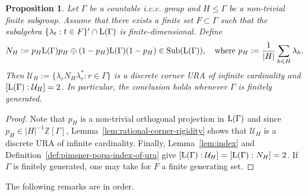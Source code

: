 \documentclass[12pt]{amsart} %
\theoremstyle{plain}
\newtheorem{proposition}[theorem]{Proposition}
\theoremstyle{definition}
\newcommand{\Z}{\mathbb{Z}}
\newcommand{\LL}{{\rm L}}
\DeclareMathOperator{\Sub}{Sub}
\begin{document}
\begin{proposition}\label{prop:finite-subgroup-corner-ura}
Let $\Gamma$ be a countable i.c.c. group and $H\leq\Gamma$ be a non-trivial
finite subgroup. Assume that there exists a finite set
$F\subset\Gamma$ such that the subalgebra $\{\lambda_t:t\in F\}'\cap\LL(\Gamma)$ is finite-dimensional.
Define
$$
N_H:=p_H\LL(\Gamma)p_H\oplus(1-p_H)\LL(\Gamma)(1-p_H)\in\Sub(\LL(\Gamma)),\quad\text{where }p_H:=\frac{1}{\vert H\vert}\sum_{h\in H}\lambda_h.
$$
Then $\mathcal U_H:=\{\lambda_rN_H\lambda_r^*:r\in\Gamma\}$
is a discrete corner URA of infinite cardinality and
$[\LL(\Gamma):\mathcal U_H]=2$.
In particular, the conclusion holds whenever $\Gamma$ is finitely generated.
\end{proposition}
\begin{proof}
Note that $p_H$ is a non-trivial orthogonal projection in $\LL(\Gamma)$ and since $p_H\in \vert H\vert^{-1}\Z[\Gamma]$,
Lemma~\ref{lem:rational-corner-rigidity} shows that $\mathcal U_H$ is a discrete URA of infinite cardinality. Finally, Lemma~\ref{lem:index} and
Definition~\ref{def:pimsner-popa-index-of-ura} give $[\LL(\Gamma):\mathcal U_H]=[\LL(\Gamma):N_H]=2$. If $\Gamma$ is finitely generated, one may take for $F$ a finite generating set.\end{proof}

The following remarks are in order.
\end{document}
